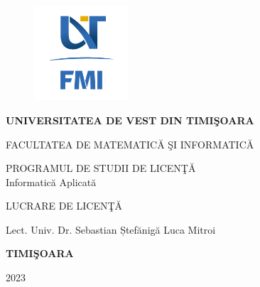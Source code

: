 \documentclass[12pt,a4paper]{report}
\theoremstyle{definition}
\theoremstyle{remark}
\begin{document}
\thispagestyle{empty}
\begin{center}
\begin{figure}[h!]
\vspace{-20pt}
\begin{center}
\includegraphics[width=100pt]{images/FMI-03}
\end{center}
\end{figure}
\graphicspath{ {D:\LaTeX_Template_Ro\Ro\images} }
\pagestyle{myfooter}



{\large{\bf UNIVERSITATEA DE VEST DIN TIMI\c SOARA

FACULTATEA DE MATEMATIC\u A \c SI INFORMATIC\u A

PROGRAMUL DE STUDII DE LICEN\c T\u A 
\newline
\\Informatică Aplicată}}

\vspace{120pt}
{\huge {\bf \centerline{LUCRARE DE LICEN\c T\u A}}}


\vspace{150pt}
\end{center}

{\large{}

\noindent Lect. Univ. Dr. Sebastian Ștefănigă \hfill Luca Mitroi}

\vfill
\begin{center}
{\bf TIMI\c SOARA

2023}
\end{center}

\newpage
\end{document}
